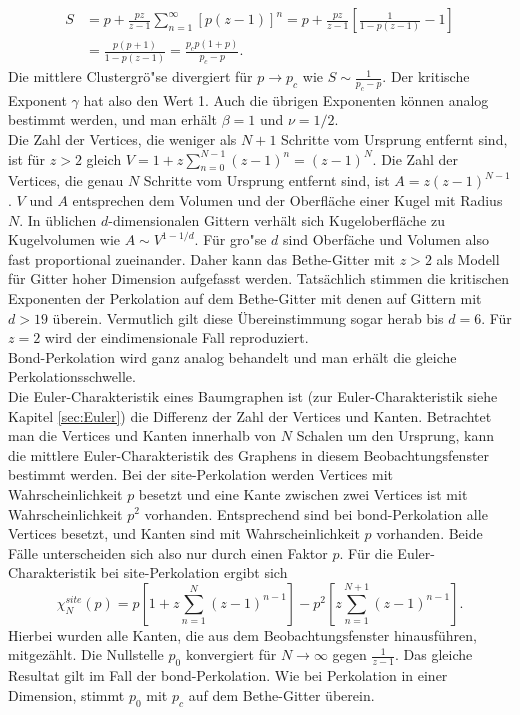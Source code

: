 \begin{equation}
  \begin{split}
  S & = p+\frac{pz}{z-1}\sum_{n=1}^{\infty}[p(z-1)]^{n}=p+\frac{pz}{z-1}\left[\frac{1}{1-p(z-1)}-1\right] \\
  & =\frac{p(p+1)}{1-p(z-1)}=\frac{p_cp(1+p)}{p_c-p}.
\end{split}
\end{equation}
Die mittlere Clustergr\"o"se divergiert f\"ur $p\rightarrow p_c$ wie $S\sim \frac{1}{p_c-p}$. Der kritische Exponent $\gamma$ hat also den Wert 1. Auch die \"ubrigen Exponenten k\"onnen analog bestimmt werden, und man erh\"alt $\beta=1$ und $\nu=1/2$.\\ 
Die Zahl der Vertices, die weniger als $N+1$ Schritte vom Ursprung entfernt sind, ist f\"ur $z>2$ gleich $V=1+z\sum_{n=0}^{N-1}(z-1)^n=(z-1)^N$. Die Zahl der Vertices, die genau $N$ Schritte vom Ursprung entfernt sind, ist $A=z(z-1)^{N-1}$. $V$ und $A$ entsprechen dem Volumen und der Oberfl\"ache einer Kugel mit Radius $N$. In \"ublichen $d$-dimensionalen Gittern verh\"alt sich Kugeloberfl\"ache zu Kugelvolumen wie $A \sim V^{1-1/d}$. F\"ur gro"se $d$ sind Oberf\"ache und Volumen also fast proportional zueinander. Daher kann das Bethe-Gitter mit $z>2$ als Modell f\"ur Gitter hoher Dimension aufgefasst werden. Tats\"achlich stimmen die kritischen Exponenten der Perkolation auf dem Bethe-Gitter mit denen auf Gittern mit $d>19$ \"uberein. Vermutlich gilt diese \"Ubereinstimmung sogar herab bis $d=6$. F\"ur $z=2$ wird der eindimensionale Fall reproduziert. \\
Bond-Perkolation wird ganz analog behandelt und man erh\"alt die gleiche Perkolationsschwelle.\\  
Die Euler-Charakteristik eines Baumgraphen ist (zur Euler-Charakteristik siehe Kapitel \ref{sec:Euler}) die Differenz der Zahl der Vertices und Kanten. Betrachtet man die Vertices und Kanten innerhalb von $N$ Schalen um den Ursprung, kann die mittlere Euler-Charakteristik des Graphens in diesem Beobachtungsfenster bestimmt werden. Bei der site-Perkolation werden Vertices mit Wahrscheinlichkeit $p$ besetzt und eine Kante zwischen zwei Vertices ist mit Wahrscheinlichkeit $p^2$ vorhanden. Entsprechend sind bei bond-Perkolation alle Vertices besetzt, und Kanten sind mit Wahrscheinlichkeit $p$ vorhanden. Beide F\"alle unterscheiden sich also nur durch einen Faktor $p$. F\"ur die Euler-Charakteristik bei site-Perkolation ergibt sich
\begin{equation}
  \chi^{site}_N(p)=p\left[1+z\sum_{n=1}^N(z-1)^{n-1}\right]-p^2\left[z\sum_{n=1}^{N+1}(z-1)^{n-1}\right].
\end{equation}
Hierbei wurden alle Kanten, die aus dem Beobachtungsfenster hinausf\"uhren, mitgez\"ahlt. Die Nullstelle $p_0$ konvergiert f\"ur $N\rightarrow \infty$ gegen $\frac{1}{z-1}$. Das gleiche Resultat gilt im Fall der bond-Perkolation. Wie bei Perkolation in einer Dimension, stimmt $p_0$ mit $p_c$ auf dem Bethe-Gitter \"uberein.\\ 

